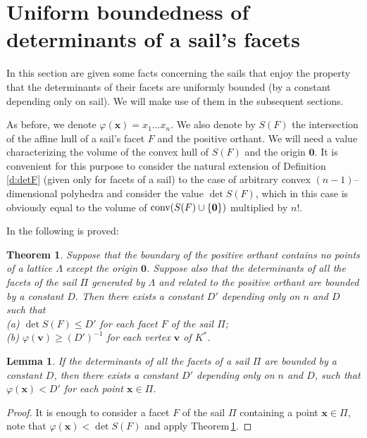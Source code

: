 \documentclass[11pt]{article}
\theoremstyle{definition}
\theoremstyle{remark}
\theoremstyle{plain}
\newtheorem{theorem}{Theorem}
\newtheorem{lemma}{Lemma}
\renewcommand{\vec}[1]{\mathbf{#1}}
\renewcommand{\geq}{\geqslant}
\renewcommand{\leq}{\leqslant}
\newcommand{\conv}{\textup{conv}}
\newcommand{\sail}{\Pi}
\newcommand{\La}{\Lambda}
\begin{document}
  \section{Uniform boundedness of determinants of a sail's facets}




  In this section are given some facts concerning the sails that enjoy the property that the
  determinants of their facets are uniformly bounded (by a constant depending only on sail).
  We will make use of them in the subsequent sections.

  As before, we denote $\varphi(\vec x)=x_1\ldots x_n$. We also denote by $S(F)$ the
  intersection of the affine hull of a sail's facet $F$ and the positive orthant. We will
  need a value characterizing the volume of the convex hull of $S(F)$ and the origin
  $\vec 0$. It is convenient for this purpose to consider the natural extension of
  Definition\,\ref{d:detF} (given only for facets of a sail) to the case of arbitrary convex
  $(n-1)$--dimensional polyhedra and consider the value $\det S(F)$, which in this case is
  obviously equal to the volume of $\conv(S(F)\cup\{\vec 0\})$ multiplied by $n!$.

  In \cite{german_norm_minima_I} the following is proved:

  \begin{theorem}   \label{t:boundedness_of_F_and_SF}
    Suppose that the boundary of the positive orthant contains no points of a lattice $\La$
    except the origin $\vec 0$. Suppose also that the determinants of all the facets of the
    sail $\sail$ generated by $\La$ and related to the positive orthant are bounded by a
    constant $D$. Then there exists a constant $D'$ depending only on $n$ and $D$ such that \\
    (a) $\det S(F)\leq D'$ for each facet $F$ of the sail $\sail$; \\
    (b) $\varphi(\vec v)\geq (D')^{-1}$ for each vertex $\vec v$ of $K^\ast$.
  \end{theorem}

  \begin{lemma}   \label{l:phi_is_bounded_on_sail}
    If the determinants of all the facets of a sail $\sail$ are bounded by a constant $D$,
    then there exists a constant $D'$ depending only on $n$ and $D$, such that
    $\varphi(\vec x)<D'$ for each point $\vec x\in\sail$.
  \end{lemma}

  \begin{proof}
    It is enough to consider a facet $F$ of the sail $\sail$ containing a point $\vec x\in\sail$,
    note that $\varphi(\vec x)<\det S(F)$ and apply Theorem\,\ref{t:boundedness_of_F_and_SF}.
  \end{proof}
\end{document}
